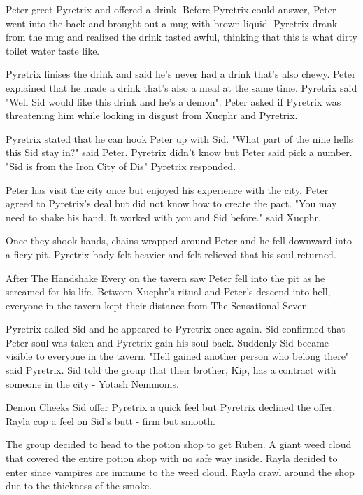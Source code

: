 Peter greet Pyretrix and offered a drink. Before Pyretrix could answer, Peter went into the back and brought out a mug with brown liquid.
Pyretrix drank from the mug and realized the drink tasted awful, thinking that this is what dirty toilet water taste like.

Pyretrix finises the drink and said he's never had a drink that's also chewy.
Peter explained that he made a drink that's also a meal at the same time.
Pyretrix said "Well Sid would like this drink and he's a demon". 
Peter asked if Pyretrix was threatening him while looking in disgust from Xucphr and Pyretrix.

Pyretrix stated that he can hook Peter up with Sid.
"What part of the nine hells this Sid stay in?" said Peter.
Pyretrix didn't know but Peter said pick a number.
"Sid is from the Iron City of Dis" Pyretrix responded.

Peter has visit the city once but enjoyed his experience with the city.
Peter agreed to Pyretrix's deal but did not know how to create the pact.
"You may need to shake his hand. It worked with you and Sid before." said Xucphr.


Once they shook hands, chains wrapped around Peter and he fell downward into a fiery pit.
Pyretrix body felt heavier and felt relieved that his soul returned.

\begin{DndSidebar}{After The Handshake}
Every on the tavern saw Peter fell into the pit as he screamed for his life.
Between Xucphr's ritual and Peter's descend into hell, everyone in the tavern kept their distance from The Sensational Seven
\end{DndSidebar}

Pyretrix called Sid and he appeared to Pyretrix once again. Sid confirmed that Peter soul was taken and Pyretrix gain his soul back.
Suddenly Sid became visible to everyone in the tavern. "Hell gained another person who belong there" said Pyretrix.
Sid told the group that their brother, Kip, has a contract with someone in the city - Yotash Nemmonis.

\begin{DndComment}{Demon Cheeks}
Sid offer Pyretrix a quick feel but Pyretrix declined the offer.
Rayla cop a feel on Sid's butt - firm but smooth.
\end{DndComment}

The group decided to head to the potion shop to get Ruben.
A giant weed cloud that covered the entire potion shop with no safe way inside.
Rayla decided to enter since vampires are immune to the weed cloud.
Rayla crawl around the shop due to the thickness of the smoke.


